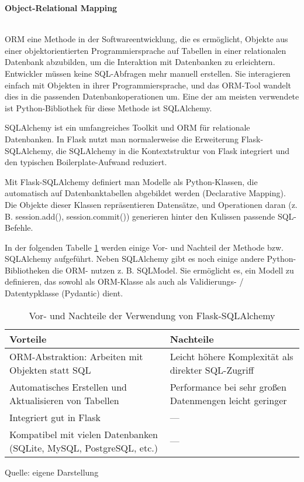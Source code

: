 \textbf{Object-Relational Mapping}

\\

\ac{ORM} eine Methode in der Softwareentwicklung, die es ermöglicht, Objekte aus einer objektorientierten Programmiersprache auf
Tabellen in einer relationalen Datenbank abzubilden, um die Interaktion mit Datenbanken zu erleichtern.
Entwickler müssen keine SQL-Abfragen mehr manuell erstellen.
Sie interagieren einfach mit Objekten in ihrer Programmiersprache,
und das ORM-Tool wandelt dies in die passenden Datenbankoperationen um. \cite*{miguelgrinberg_flask_mega_tutorial_db}
Eine der am meisten verwendete ist Python-Bibliothek für diese Methode ist SQLAlchemy.

SQLAlchemy ist ein umfangreiches Toolkit und \ac{ORM} für relationale Datenbanken.
In Flask nutzt man normalerweise die Erweiterung Flask-SQLAlchemy, die SQLAlchemy in die Kontextstruktur von Flask
integriert und den typischen Boilerplate-Aufwand reduziert.\cite*{flask_sqlalchemy_docs}

Mit Flask-SQLAlchemy definiert man Modelle als Python-Klassen, die automatisch auf Datenbanktabellen abgebildet werden (Declarative Mapping).
Die Objekte dieser Klassen repräsentieren Datensätze, und Operationen daran (z. B. session.add(), session.commit()) generieren hinter den Kulissen passende SQL-Befehle.\cite*{flask_sqlalchemy_docs}

In der folgenden Tabelle \ref{tab:sqlalchemy_vor_nachteile} werden einige Vor- und Nachteil der Methode bzw. SQLAlchemy aufgeführt.
Neben SQLAlchemy gibt es noch einige andere Python-Bibliotheken die \ac{ORM}- nutzen z. B. SQLModel.
Sie ermöglicht es, ein Modell zu definieren, das sowohl als ORM-Klasse als auch als Validierungs- / Datentypklasse (Pydantic) dient\cite*{sqlmodel_docs}.

\begin{table}[H]
    \centering
    \begin{tabular}{|p{}|p{}|}
        \hline
        \textbf{Vorteile} & \textbf{Nachteile} \\
        \hline
        ORM-Abstraktion: Arbeiten mit Objekten statt SQL &
        Leicht höhere Komplexität als direkter SQL-Zugriff \\
        \hline
        Automatisches Erstellen und Aktualisieren von Tabellen &
        Performance bei sehr großen Datenmengen leicht geringer \\
        \hline
        Integriert gut in Flask &
        — \\
        \hline
        Kompatibel mit vielen Datenbanken (SQLite, MySQL, PostgreSQL, etc.) &
        — \\
        \hline
    \end{tabular}
    \caption{Vor- und Nachteile der Verwendung von Flask-SQLAlchemy}
    \label{tab:sqlalchemy_vor_nachteile}
    \vspace{0.2cm}
    {\small Quelle: eigene Darstellung}
\end{table}

